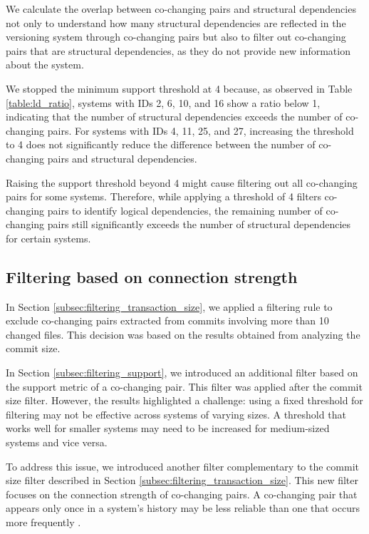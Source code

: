 We calculate the overlap between co-changing pairs and structural dependencies not only to understand how many structural dependencies are reflected in the versioning system through co-changing pairs but also to filter out co-changing pairs that are structural dependencies, as they do not provide new information about the system.

We stopped the minimum support threshold at 4 because, as observed in Table \ref{table:ld_ratio}, systems with IDs 2, 6, 10, and 16 show a ratio below 1, indicating that the number of structural dependencies exceeds the number of co-changing pairs. For systems with IDs 4, 11, 25, and 27, increasing the threshold to 4 does not significantly reduce the difference between the number of co-changing pairs and structural dependencies.

Raising the support threshold beyond 4 might cause filtering out all co-changing pairs for some systems. Therefore, while applying a threshold of 4 filters co-changing pairs to identify logical dependencies, the remaining number of co-changing pairs still significantly exceeds the number of structural dependencies for certain systems.


\subsection{Filtering based on connection strength}
\label{subsec:filtering_connection_strength}

\hspace{4em}In Section \ref{subsec:filtering_transaction_size}, we applied a filtering rule to exclude co-changing pairs extracted from commits involving more than 10 changed files. This decision was based on the results obtained from analyzing the commit size.

In Section \ref{subsec:filtering_support}, we introduced an additional filter based on the support metric of a co-changing pair. This filter was applied after the commit size filter. However, the results highlighted a challenge: using a fixed threshold for filtering may not be effective across systems of varying sizes. A threshold that works well for smaller systems may need to be increased for medium-sized systems and vice versa.

To address this issue, we introduced another filter complementary to the commit size filter described in Section \ref{subsec:filtering_transaction_size}. This new filter focuses on the connection strength of co-changing pairs. A co-changing pair that appears only once in a system's history may be less reliable than one that occurs more frequently \cite{cluster-access}.


